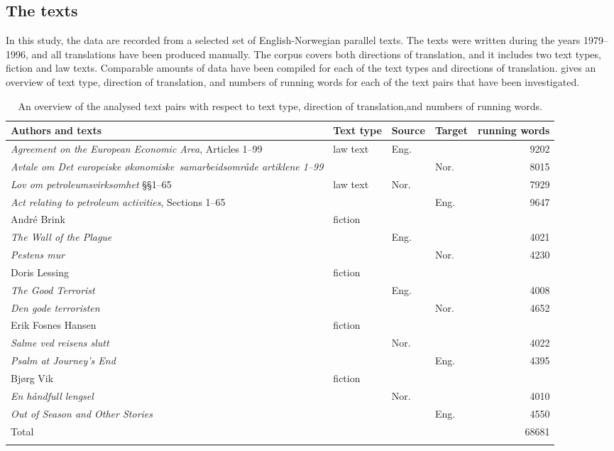 \documentclass[output=paper]{LSP/langsci}
\begin{document}
\subsection{The texts}\label{sec:thunes:4.2}

In this study, the data are recorded from a selected set of English-Norwegian parallel texts. The texts were written during the years 1979--1996, and all translations have been produced manually. The corpus covers both directions of translation, and it includes two text types, fiction and law texts. Comparable amounts of data have been compiled for each of the text types and directions of translation.  gives an overview of text type, direction of translation, and numbers of running words for each of the text pairs that have been investigated.


\begin{table}
\begin{tabularx}{\textwidth}{Qlllr}
\lsptoprule 
{Authors and texts} & {Text type} & {Source} & {Target} & \parbox{1.2cm}{ \mbox{running}  {words}}\\ 
\midrule
\textit{Agreement on the European Economic Area}, Articles 1--99 & law text & Eng. & {} & 9202\\ 
\textit{Avtale om Det europeiske \mbox{økonomiske samarbeidsområde} artiklene 1--99} & {} & {} & Nor.  & 8015\\
\tablevspace
\textit{Lov om petroleumsvirksomhet} §§1--65 & law text &  Nor.  & {} & 7929\\ 
\textit{Act relating to petroleum activities}, Sections 1--65 & {} & {} & Eng. & 9647\\ 
\tablevspace
André Brink & fiction & {} & {} & {}\\
\textit{The Wall of the Plague} & {} & Eng. & {} & 4021\\
\textit{Pestens mur} &  {} & {} & Nor.  & 4230\\
\tablevspace
Doris Lessing & fiction & {} & {} & {}\\
\textit{The Good Terrorist} & {} & Eng. & {} & 4008\\
\textit{Den gode terroristen} & {} & {} & Nor.  & 4652\\
\tablevspace
Erik Fosnes Hansen & fiction & {} & {} & {}\\
\textit{Salme ved reisens slutt} & {} & Nor.  & {} &  4022\\
\textit{Psalm at Journey's End} & {} & {} & Eng. & 4395\\
\tablevspace
Bjørg Vik & fiction & {} & {} & {}\\
\textit{En håndfull lengsel} & {} & Nor.  & {} & 4010\\
\textit{Out of Season and Other Stories} & {} & {} & Eng. & 4550\\
\midrule
 {Total} &  &  &  & 68681\\
\lspbottomrule
\end{tabularx}
\caption{An overview of the analysed text pairs with respect to text type, direction of translation,and numbers of running words.}
\label{tab:thunes:1}
\end{table}
\end{document}
